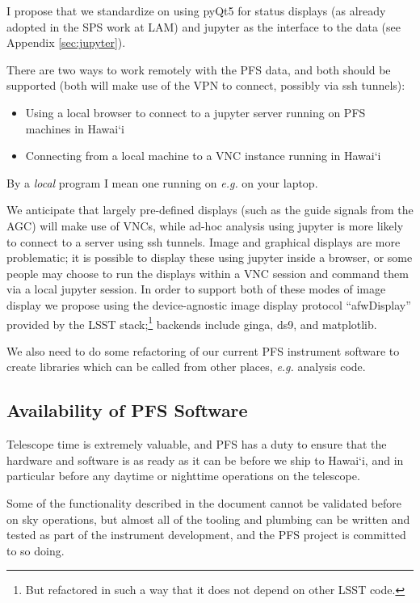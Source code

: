 \documentclass[12pt]{article}
\newcommand{\eg}{\textit{e.g.}\xspace}
\newcommand{\AGC}{\gls{AGC}\xspace}
\newcommand{\PFS}{\gls{PFS}\xspace}
\newcommand{\SPS}{\gls{SPS}\xspace}
\newcommand{\jupyter}{\gls{jupyter}\xspace}
\newcommand{\ssh}{\gls{ssh}\xspace}
\newcommand{\appRef}[1]{Appendix \ref{sec:#1}} %
\newcommand{\secRef}[1]{Section \ref{sec:#1}}
\begin{document}
I propose that we standardize on using \gls{pyQt5} for status displays (as already adopted in the \SPS
work at \gls{LAM}) and
\jupyter as the interface to the data (see \appRef{jupyter}).

There are two ways to work remotely with the \PFS data, and both should be supported (both will
make use of the \gls{VPN} to connect, possibly via \ssh tunnels):
\begin{itemize}
\item Using a local browser to connect to a \jupyter server running
  on \PFS machines in Hawai`i
\item Connecting from a local machine to a \gls{VNC} instance running in Hawai`i
\end{itemize}
By a \textit{local} program I mean one running on \eg on your laptop.

We anticipate that largely pre-defined displays (such as the guide signals from the \AGC) will make
use of \glspl{VNC}, while ad-hoc analysis using \jupyter is more likely to connect to a server
using \ssh tunnels.  Image and graphical displays are more problematic; it is possible to display
these using \jupyter inside a browser, or some people may choose to run the displays within
a \gls{VNC} session and command them via a local \jupyter session.  In order to support both of
these modes of image display we propose using the device-agnostic image display protocol ``afwDisplay''
provided by the LSST stack;\footnote{But refactored in such a way that it does not depend on other LSST code.}
backends include \gls{ginga}, \gls{ds9}, and \gls{matplotlib}.

We also need to do some refactoring of our current \PFS instrument software to create libraries
which can be called from other places, \eg analysis code.

\subsection{Availability of PFS Software}
\label{sec:availability}

Telescope time is extremely valuable, and \PFS has a duty to ensure that the hardware and software
is as ready as it can be before we ship to Hawai`i, and in particular before any daytime or nighttime
operations on the telescope.

Some of the functionality described in the document cannot be validated before on sky operations,
but almost all of the tooling and plumbing can be written and tested as part of the instrument
development, and the \PFS project is committed to so doing.
\end{document}
